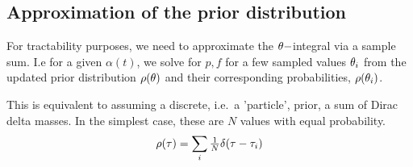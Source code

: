 \subsection{Approximation of the prior distribution}
For tractability purposes, we need to approximate the ${ \theta}-$integral via a
sample sum. I.e for a given $\alpha(t)$, we solve for $p,f$ for a few sampled
values ${ \theta}_i$ from the updated prior distribution $\rho({ \theta})$ and their
corresponding probabilities, $\rho({ \theta}_i)$.

This is equivalent to assuming a discrete, i.e.\ a 'particle', prior, a sum
of Dirac delta masses. In the simplest case, these are $N$ values with equal
probability.
\begin{equation}
\rho({ \tau }) = \sum_i  
	\tfrac 1N \delta({ \tau }- { \tau }_i) 
\label{eq:basic_prior_over_tau}
\end{equation} 


